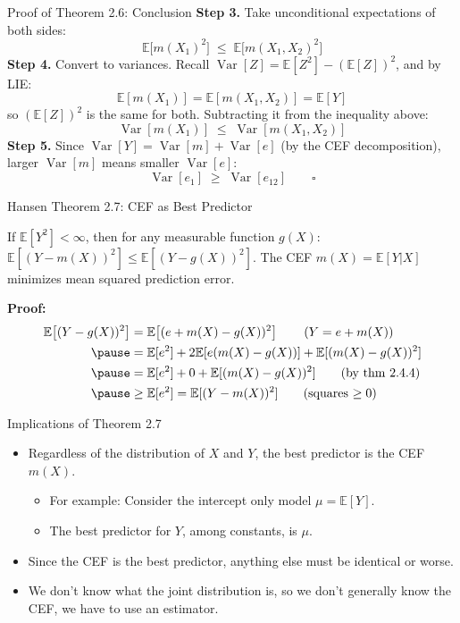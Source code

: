 \documentclass[aspectratio=169, handout, t]{beamer}
\numberwithin{equation}{section}
\begin{document}
\begin{frame}{Proof of Theorem 2.6: Conclusion}
\textbf{Step 3.} Take unconditional expectations of both sides:
$$\mathbb{E}\!\big[m(X_1)^2\big] \;\leq\; \mathbb{E}\!\big[m(X_1,X_2)^2\big]$$
\pause
\textbf{Step 4.} Convert to variances. Recall $\operatorname{Var}[Z]=\mathbb{E}[Z^2]-(\mathbb{E}[Z])^2$, and by LIE:
$$\mathbb{E}[m(X_1)]=\mathbb{E}[m(X_1,X_2)]=\mathbb{E}[Y]$$
so $(\mathbb{E}[Z])^2$ is the same for both.  Subtracting it from the inequality above:
$$\operatorname{Var}[m(X_1)] \;\leq\; \operatorname{Var}[m(X_1,X_2)]$$
\pause
\textbf{Step 5.} Since $\operatorname{Var}[Y]=\operatorname{Var}[m]+\operatorname{Var}[e]$ (by the CEF decomposition), larger $\operatorname{Var}[m]$ means smaller $\operatorname{Var}[e]$:
$$\operatorname{Var}[e_1] \;\geq\; \operatorname{Var}[e_{12}] \qquad \square$$
\end{frame}


\begin{frame}{Hansen Theorem 2.7: CEF as Best Predictor}
\begin{tcolorbox}[colback=blue!5, colframe=blue!50, title=Theorem 2.7 (CEF Is the Best Predictor), boxsep=2pt, top=2pt, bottom=2pt]
If $\mathbb{E}[Y^2]<\infty$, then for any measurable function $g(X)$:
$\mathbb{E}\!\left[(Y-m(X))^2\right] \leq \mathbb{E}\!\left[(Y-g(X))^2\right]$.
The CEF $m(X)=\mathbb{E}[Y|X]$ minimizes mean squared prediction error.
\end{tcolorbox}
\vspace{-4pt}
{\small\textbf{Proof:}}\pause
{\footnotesize
\begin{align*}
\mathbb{E}\!\left[(Y-g(X))^2\right]&=\mathbb{E}\!\left[(e+m(X)-g(X))^2\right] \tag{$Y= e+m(X)$}\\ \pause
&=\mathbb{E}[e^2]+2\mathbb{E}[e(m(X)-g(X))]+\mathbb{E}[(m(X)-g(X))^2]\\\pause
 &=\mathbb{E}[e^2]+0+\mathbb{E}[(m(X)-g(X))^2] \tag{by thm 2.4.4}\\\pause
  &\geq \mathbb{E}[e^2] = \mathbb{E}[(Y-m(X))^2] \tag{squares $\geq 0$}
 \end{align*}}
\end{frame}


\begin{frame}{Implications of Theorem 2.7}
\begin{itemize}
\item Regardless of the distribution of $X$ and $Y$, the best predictor is the CEF $m(X)$.
\begin{itemize}
\item For example: Consider the intercept only model $\mu=\mathbb{E}[Y]$.
\item The best predictor for $Y$, among constants, is $\mu$.
\end{itemize}
\item Since the CEF is the best predictor, anything else must be identical or worse.
\item We don't know what the joint distribution is, so we don't generally know the CEF, we have to use an estimator.
\end{itemize}
\end{frame}
\end{document}
